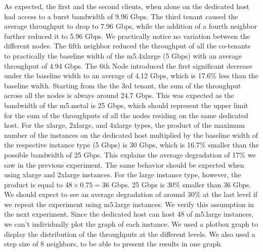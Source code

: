 \noindent
As expected, the first and the second clients, when alone on the dedicated host had access to a burst 
bandwidth of 9.96 Gbps. The third tenant caused the average throughput to drop to 7.96 Gbps, while the 
addition of a fourth neighbor further reduced it to 5.96 Gbps. We practically notice no variation between 
the different nodes. The fifth neighbor reduced the throughput of all the co-tenants to practically 
the baseline width of the m5.4xlarge (5 Gbps) with an average throughput of 4.94 Gbps. The 6th Node 
introduced the first significant decrease under the baseline width to an average of 4.12 Gbps, 
which is 17.6\% less than the baseline width. Starting from the the 3rd tenant, the sum 
of the throughput across all the nodes is always around 24.7 Gbps.  This was expected as the bandwidth 
of the m5.metal is 25 Gbps, which should represent the upper limit for the sum of the throughputs of all the nodes
residing on the same dedicated host. For the xlarge, 2xlarge, and 4xlarge types, the product of the 
maximum number of the instances on the dedicated host multiplied by the baseline width of the respective
instance type (5 Gbps) is 30 Gbps, which is 16.7\% smaller than the possible bandwidth of 25 Gbps. 
This explains the average degradation of 17\% we saw in the previous experiment. The same behavior
should be expected when using xlarge and 2xlarge instances. For the large instance type, however, the 
product is equal to
\begin{math} 48 \times 0.75 = 36\end{math} Gbps. 
25 Gbps is 30\% smaller than 36 Gbps. We should expect to see an average 
degradation of around 30\% at the last level if we repeat the experiment using m5.large instances. 
We verify this assumption in the next experiment. Since the dedicated host can host 48 of m5.large 
instances, we can't individually plot the graph of each instance. We used a plotbox graph to display the 
distribution of the throughputs at the different levels. We also used a step size of 8 neighbors, to be 
able to present the results in one graph. 


